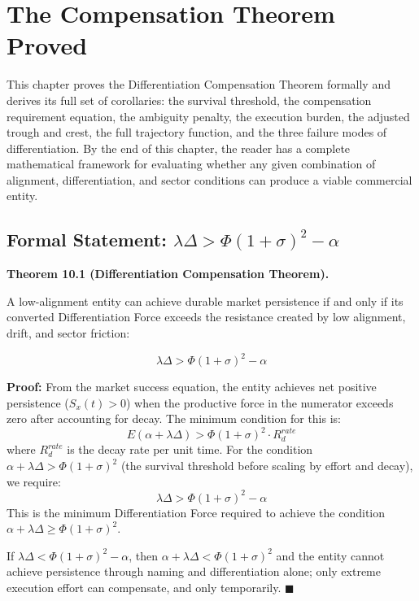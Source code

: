 \documentclass[12pt, openany]{book}
\theoremstyle{thmstyle}
\theoremstyle{defstyle}
\begin{document}
\chapter{The Compensation Theorem Proved}

\begin{keybox}
This chapter proves the Differentiation Compensation Theorem formally and derives its full set of corollaries: the survival threshold, the compensation requirement equation, the ambiguity penalty, the execution burden, the adjusted trough and crest, the full trajectory function, and the three failure modes of differentiation. By the end of this chapter, the reader has a complete mathematical framework for evaluating whether any given combination of alignment, differentiation, and sector conditions can produce a viable commercial entity.
\end{keybox}

\section{Formal Statement: $\lambda\Delta > \Phi(1+\sigma)^2 - \alpha$}

\begin{theorembox}
\textbf{Theorem 10.1 (Differentiation Compensation Theorem).}

A low-alignment entity can achieve durable market persistence if and only if its converted Differentiation Force exceeds the resistance created by low alignment, drift, and sector friction:

\begin{equation}
\lambda\Delta > \Phi(1+\sigma)^2 - \alpha
\label{eq:compensation_theorem}
\end{equation}

\textbf{Proof:}
From the market success equation, the entity achieves net positive persistence ($S_x(t) > 0$) when the productive force in the numerator exceeds zero after accounting for decay. The minimum condition for this is:
\[
E(\alpha + \lambda\Delta) > \Phi(1+\sigma)^2 \cdot R_d^{rate}
\]
where $R_d^{rate}$ is the decay rate per unit time. For the condition $\alpha + \lambda\Delta > \Phi(1+\sigma)^2$ (the survival threshold before scaling by effort and decay), we require:
\[
\lambda\Delta > \Phi(1+\sigma)^2 - \alpha
\]
This is the minimum Differentiation Force required to achieve the condition $\alpha + \lambda\Delta \geq \Phi(1+\sigma)^2$.

If $\lambda\Delta < \Phi(1+\sigma)^2 - \alpha$, then $\alpha + \lambda\Delta < \Phi(1+\sigma)^2$ and the entity cannot achieve persistence through naming and differentiation alone; only extreme execution effort can compensate, and only temporarily. $\blacksquare$
\end{theorembox}
\end{document}
